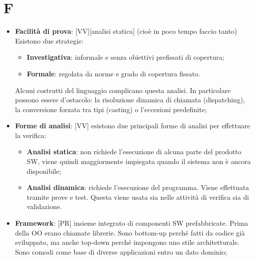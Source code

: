 % 
%
% 
%

\section{F}
	\begin{itemize}

		\item \textbf{Facilità di prova}: [VV][analisi statica] (cioè in poco tempo faccio tanto) Esistono due strategie:
			\begin{itemize}
				\item \textbf{Investigativa}: informale e senza obiettivi prefissati di copertura;
				\item \textbf{Formale}: regolata da norme e grado di copertura fissato.
			\end{itemize}
			\noindent
			Alcuni costrutti del linguaggio complicano questa analisi. In particolare possono essere d'ostacolo: la risoluzione dinamica di chiamata (dispatching), la conversione forzata tra tipi (casting) o l'eccezioni predefinite;

		\item \textbf{Forme di analisi}: [VV] esistono due principali forme di analisi per effettuare la verifica:
			\begin{itemize}
				\item \textbf{Analisi statica}: non richiede l'esecuzione di alcuna parte del prodotto SW, viene quindi maggiormente impiegata quando il sistema non è ancora disponibile;
				\item \textbf{Analisi dinamica}: richiede l'esecuzione del programma. Viene effettuata tramite prove e test. Questa viene usata sia nelle attività di verifica sia di validazione.
			\end{itemize}

		\item \textbf{Framework}: [PR] insieme integrato di componenti SW prefabbricate. Prima della OO erano chiamate librerie. Sono bottom-up perché fatti da codice già sviluppato, ma anche top-down perché impongono uno stile architetturale. Sono comodi come base di diverse applicazioni entro un dato dominio;

	\end{itemize}